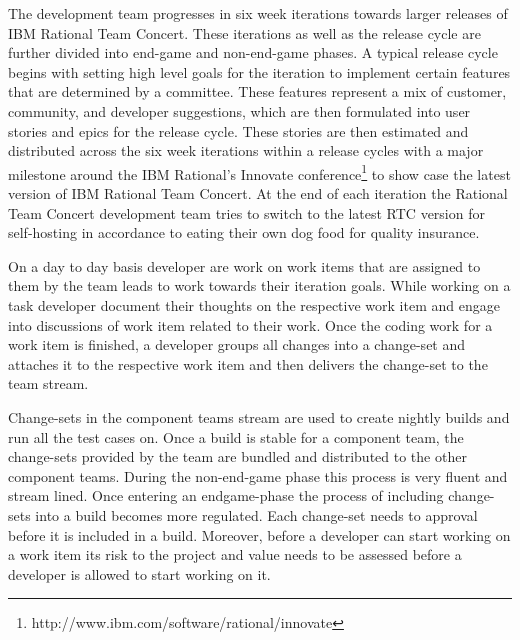 The development team progresses in six week iterations towards larger releases of IBM Rational Team Concert.
These iterations as well as the release cycle are further divided into end-game and non-end-game phases.
A typical release cycle begins with setting high level goals for the iteration to implement certain features that are determined by a committee.
These features represent a mix of customer, community, and developer suggestions, which are then formulated into user stories and epics for the release cycle.
These stories are then estimated and distributed across the six week iterations within a release cycles with a major milestone around the IBM Rational's Innovate conference\footnote{http://www.ibm.com/software/rational/innovate} to show case the latest version of IBM Rational Team Concert. 
At the end of each iteration the Rational Team Concert development team tries to switch to the latest RTC version for self-hosting in accordance to eating their own dog food for quality insurance.

On a day to day basis developer are work on work items that are assigned to them by the team leads to work towards their iteration goals.
While working on a task developer document their thoughts on the respective work item and engage into discussions of work item related to their work.
Once the coding work for a work item is finished, a developer groups all changes into a change-set and attaches it to the respective work item and then delivers the change-set to the team stream.

Change-sets in the component teams stream are used to create nightly builds and run all the test cases on.
Once a build is stable for a component team, the change-sets provided by the team are bundled and distributed to the other component teams.
During the non-end-game phase this process is very fluent and stream lined.
Once entering an endgame-phase the process of including change-sets into a build becomes more regulated.
Each change-set needs to approval before it is included in a build.
Moreover, before a developer can start working on a work item its risk to the project and value needs to be assessed before a developer is allowed to start working on it.
